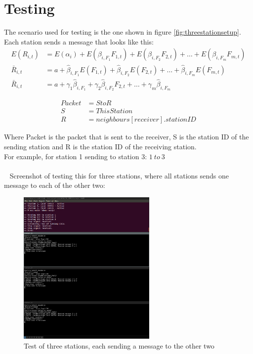 \section{Testing}
The scenario used for testing is the one shown in figure \ref{fig:threestationsetup}.\\
Each station sends a message that looks like this:\\

\begin{align*}
  E(R_{i,t})    &= E(\alpha_i)+E(\beta_{i,F_1 } F_{1,t})+E(\beta_{i,F_2 } F_{2,t})+\ldots+E(\beta_{i,F_m } F_{m,t}) \\
  \bar{R}_{i,t} &= a+\hat{\beta}_{i,F_1 } E(F_{1,t})+\hat{\beta}_{i,F_2 } E(F_{2,t})+\ldots+\hat{\beta}_{i,F_m } E(F_{m,t}) \\
  \bar{R}_{i,t} &= a+\gamma_1\hat{\beta}_{i,F_1 } +\gamma_2\hat{\beta}_{i,F_2 } F_{2,t}+\ldots+\gamma_m\hat{\beta}_{i,F_m }
\end{align*}

\begin{align*}
Packet &= S to R\\
S &= ThisStation\\
R &= neighbours[receiver].stationID
\end{align*}

Where Packet is the packet that is sent to the receiver, S is the station ID of the sending station and R is the station ID of the receiving station.\\
For example, for station 1 sending to station 3: $1\ to\ 3$\\
\\~
Screenshot of testing this for three stations, where all stations sends one message to each of the other two:
\begin{figure}[H]
\centering
\includegraphics[width=0.6\textwidth]{Test1.png}
\caption{Test of three stations, each sending a message to the other two}
\label{fig:threestationtest}
\end{figure}




